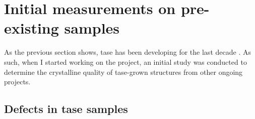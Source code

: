 \section{Initial measurements on pre-existing samples}
As the previous section shows, \acs{tase} has been developing for the last decade \cite{Borg2014}. As such, when I started working on the project, an initial study was conducted to determine the crystalline quality of \acs{tase}-grown structures from other ongoing projects. 

\subsection{\texorpdfstring{Defects in \acs{tase} samples}{Defects in TASE samples}}
\label{subsec:pre-existing_samples}

\begin{figure}
    \centering
\end{figure}
